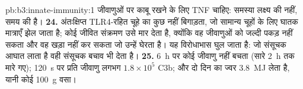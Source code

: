 \begin{solution}{pb:b3:innate-immunity:1}
जीवाणुओं पर काबू रखने के लिए TNF चाहिए: समस्या लक्ष्य की नहीं, समय की
है।
\textbf{24.} अंतःक्षिप्त  TLR4-रहित चूहे का कुछ नहीं
बिगाड़ता, जो सामान्य चूहों के लिए घातक मात्राएँ झेल जाता है; कोई जीवित
 संक्रमण उसे मार देता है, क्योंकि वह जीवाणुओं को जल्दी
पकड़ नहीं सकता और वह  खड़ा नहीं कर सकता जो उन्हें घेरता है। यह
विरोधाभास घुल जाता है: जो संसूचक आघात लाता है वही संसूचक बचाव भी देता
है।
\textbf{25.} \qty{6}{h} पर कोई जीवाणु नहीं बचता (सारे \qty{2}{h} तक मारे
गए); \qty{120}{s} पर प्रति जीवाणु लगभग $1.8\times 10^{5}$ C3b; और दो
दिन का ज्वर \qty{3.8}{MJ} लेता है, यानी कोई \qty{100}{g} वसा।
\end{solution}
